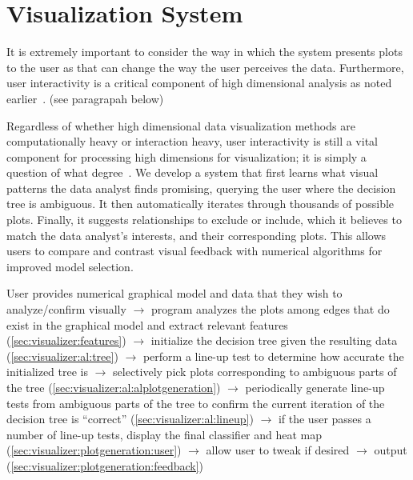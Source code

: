 \chapter{Visualization System \label{ch:visualizer}}

It is extremely important to consider the way in which the system presents plots to the user as that can change the way the user perceives the data. Furthermore, user interactivity is a critical component of high dimensional analysis as noted earlier~\cite{lius2016}. (see paragrapah below)

Regardless of whether high dimensional data visualization methods are computationally heavy or interaction heavy, user interactivity is still a vital component for processing high dimensions for visualization; it is simply a question of what degree~\cite{lius2016}. We develop a system that first learns what visual patterns the data analyst finds promising, querying the user where the decision tree is ambiguous. It then automatically iterates through thousands of possible plots. Finally, it suggests relationships to exclude or include, which it believes to match the data analyst's interests, and their corresponding plots. This allows users to compare and contrast visual feedback with numerical algorithms for improved model selection.

User provides numerical graphical model and data that they wish to analyze/confirm visually $\rightarrow$ program analyzes the plots among edges that do exist in the graphical model and extract relevant features (\ref{sec:visualizer:features}) $\rightarrow$ initialize the decision tree given the resulting data (\ref{sec:visualizer:al:tree}) $\rightarrow$ perform a line-up test to determine how accurate the initialized tree is $\rightarrow$  selectively pick plots corresponding to ambiguous parts of the tree (\ref{sec:visualizer:al:alplotgeneration}) $\rightarrow$ periodically generate line-up tests from ambiguous parts of the tree to confirm the current iteration of the decision tree is ``correct'' (\ref{sec:visualizer:al:lineup}) $\rightarrow$  if the user passes a number of line-up tests, display the final classifier and heat map (\ref{sec:visualizer:plotgeneration:user}) $\rightarrow$ allow user to tweak if desired $\rightarrow$ output (\ref{sec:visualizer:plotgeneration:feedback})




